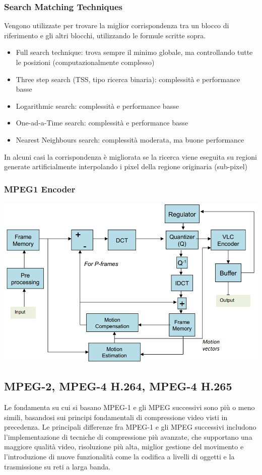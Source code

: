 \documentclass[a4paper,11pt]{article} %
\begin{document}
\subsubsection{Search Matching Techniques}
Vengono utilizzate per trovare la miglior corrispondenza tra un blocco di riferimento e gli altri blocchi, utilizzando le formule scritte sopra.
\begin{itemize}
\item Full search technique: trova sempre il minimo globale, ma controllando tutte le posizioni (computazionalmente complesso)
\item Three step search (TSS, tipo ricerca binaria): complessità e performance basse
\item Logarithmic search: complessità e performance basse
\item One-ad-a-Time search: complessità e performance basse
\item Nearest Neighbours search: complessità moderata, ma buone performance
\end{itemize}

In alcuni casi la corrispondenza è migliorata se la ricerca viene eseguita su regioni generate artificialmente interpolando i pixel della regione originaria (sub-pixel)

\subsubsection{MPEG1 Encoder}
\begin{center}
    \includegraphics[width=0.8\linewidth]{MPEG1 encoder.png}
\end{center}

\subsection{MPEG-2, MPEG-4 H.264, MPEG-4 H.265}
Le fondamenta su cui si basano MPEG-1 e gli MPEG successivi sono più o meno simili, basandosi sui principi fondamentali di compressione video visti in precedenza. Le principali differenze fra MPEG-1 e gli MPEG successivi includono l'implementazione di tecniche di compressione più avanzate, che supportano una maggiore qualità video, risoluzione più alta, miglior gestione del movimento e l'introduzione di nuove funzionalità come la codifica a livelli di oggetti e la trasmissione su reti a larga banda.
\end{document}
